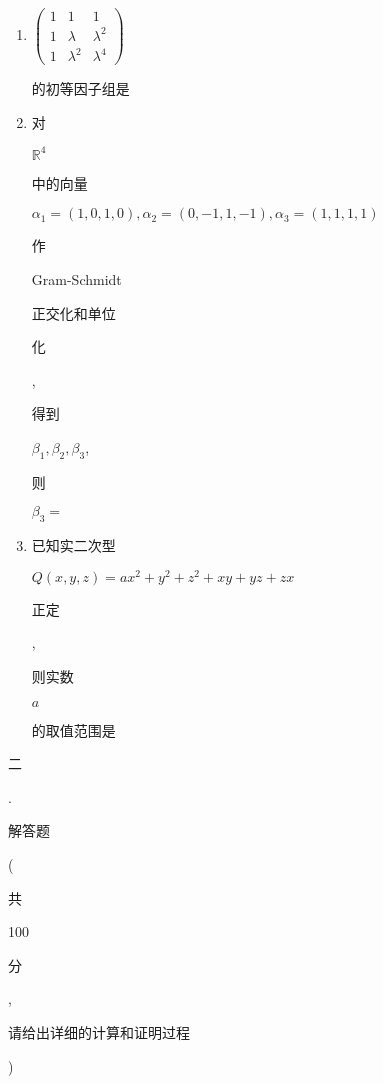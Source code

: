 \documentclass[10pt]{article}
\begin{document}
\begin{enumerate}
  \item $\left(\begin{array}{ccc}1 & 1 & 1 \\ 1 & \lambda & \lambda^{2} \\ 1 & \lambda^{2} & \lambda^{4}\end{array}\right)$ \begin{CJK}{UTF8}{mj}的初等因子组是\end{CJK}

  \item \begin{CJK}{UTF8}{mj}对\end{CJK} $\mathbb{R}^{4}$ \begin{CJK}{UTF8}{mj}中的向量\end{CJK} $\alpha_{1}=(1,0,1,0), \alpha_{2}=(0,-1,1,-1), \alpha_{3}=(1,1,1,1)$ \begin{CJK}{UTF8}{mj}作\end{CJK} Gram-Schmidt \begin{CJK}{UTF8}{mj}正交化和单位\end{CJK} \begin{CJK}{UTF8}{mj}化\end{CJK}, \begin{CJK}{UTF8}{mj}得到\end{CJK} $\beta_{1}, \beta_{2}, \beta_{3}$, \begin{CJK}{UTF8}{mj}则\end{CJK} $\beta_{3}=$

  \item \begin{CJK}{UTF8}{mj}已知实二次型\end{CJK} $Q(x, y, z)=a x^{2}+y^{2}+z^{2}+x y+y z+z x$ \begin{CJK}{UTF8}{mj}正定\end{CJK}, \begin{CJK}{UTF8}{mj}则实数\end{CJK} $a$ \begin{CJK}{UTF8}{mj}的取值范围是\end{CJK}

\end{enumerate}
\begin{CJK}{UTF8}{mj}二\end{CJK}. \begin{CJK}{UTF8}{mj}解答题\end{CJK}(\begin{CJK}{UTF8}{mj}共\end{CJK} 100 \begin{CJK}{UTF8}{mj}分\end{CJK}, \begin{CJK}{UTF8}{mj}请给出详细的计算和证明过程\end{CJK})
\end{document}
